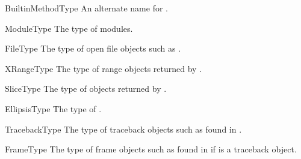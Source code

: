 \begin{datadesc}{BuiltinMethodType}
An alternate name for .
\end{datadesc}

\begin{datadesc}{ModuleType}
The type of modules.
\end{datadesc}

\begin{datadesc}{FileType}
The type of open file objects such as .
\end{datadesc}

\begin{datadesc}{XRangeType}
The type of range objects returned by
.
\end{datadesc}

\begin{datadesc}{SliceType}
The type of objects returned by
.
\end{datadesc}

\begin{datadesc}{EllipsisType}
The type of .
\end{datadesc}

\begin{datadesc}{TracebackType}
The type of traceback objects such as found in
.
\end{datadesc}

\begin{datadesc}{FrameType}
The type of frame objects such as found in  if
 is a traceback object.
\end{datadesc}
